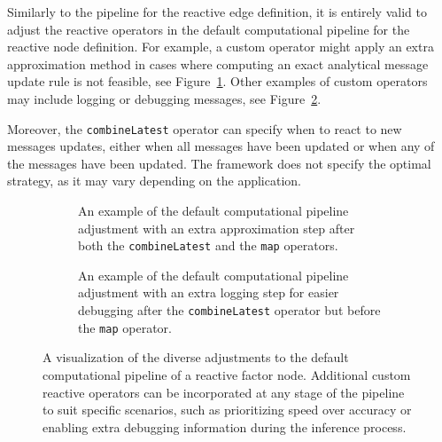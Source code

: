 Similarly to the pipeline for the reactive edge definition, it is entirely valid to adjust the
reactive operators in the default computational pipeline for the reactive node definition.
For example, a custom operator might apply an extra approximation method in cases where
computing an exact analytical message update rule is not feasible, see
Figure~\ref{fig:rmp:reactive_node_pipeline_N}.
Other examples of custom operators may include logging or debugging messages, see
Figure~\ref{fig:rmp:reactive_node_pipeline_logging}.

Moreover, the \texttt{combineLatest} operator can specify when to react to new messages updates, either when all messages have been updated or when any of the messages have been updated.
The framework does not specify the optimal strategy, as it may vary depending on the
application.

\begin{figure}
  \centering
  \begin{subfigure}[t]{0.45\textwidth}
    \centering
    \resizebox{\textwidth}{!}{}
    \caption{An example of the default computational pipeline adjustment with an extra approximation step after both the \texttt{combineLatest} and the \texttt{map} operators.
    }
    \label{fig:rmp:reactive_node_pipeline_N}
  \end{subfigure}
  \hfill
  \begin{subfigure}[t]{0.45\textwidth}
    \centering
    \resizebox{\textwidth}{!}{}
    \caption{An example of the default computational pipeline adjustment with an extra logging step for easier debugging after the \texttt{combineLatest} operator but before the \texttt{map} operator.
    }
    \label{fig:rmp:reactive_node_pipeline_logging}
  \end{subfigure}
  \caption{A visualization of the diverse adjustments to the default computational pipeline of a reactive factor node.
    Additional custom reactive operators can be incorporated at any stage of the pipeline to suit
    specific scenarios, such as prioritizing speed over accuracy or enabling extra debugging
    information during the inference process.
  }
  \label{fig:rmp:reactive_node_pipeline}
\end{figure}

